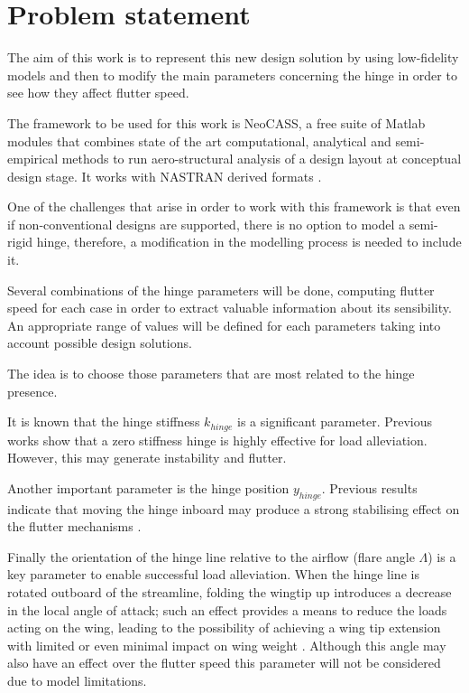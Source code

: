 \documentclass[conference]{IEEEtran}
\begin{document}
\section{Problem statement}
\label{sec:problem-statement}

The aim of this work is to represent this new design solution by using low-fidelity models and then to modify the main parameters concerning the hinge in order to see how they affect flutter speed.

The framework to be used for this work is NeoCASS, a free suite of Matlab modules that combines state of the art computational, analytical and semi-empirical methods to run aero-structural analysis of a design layout at conceptual design stage. It works with NASTRAN derived formats \cite{cavagna2011neocass}.

One of the challenges that arise in order to work with this framework is that even if non-conventional designs are supported, there is no option to model a semi-rigid hinge, therefore, a modification in the modelling process is needed to include it.

Several combinations of the hinge parameters will be done, computing flutter speed for each case in order to extract valuable information about its sensibility. An appropriate range of values will be defined for each parameters taking into account possible design solutions.

The idea is to choose those parameters that are most related to the hinge presence.

It is known that the hinge stiffness $k_{hinge}$ is a significant parameter. Previous works \cite{Wilson2014,Castrichini2016}show that a zero stiffness hinge is highly effective for load alleviation. However, this may generate instability and flutter.

Another important parameter is the hinge position $y_{hinge}$. Previous results indicate that moving the hinge inboard may produce a strong stabilising effect on the flutter mechanisms \cite{Wilson2014}.

Finally the orientation of the hinge line relative to the airflow (flare angle $\Lambda$) is a key parameter to enable successful load alleviation. When the hinge line is rotated outboard of the streamline, folding the wingtip up introduces a decrease in the local angle of attack; such an effect provides a means to reduce the loads acting on the wing, leading to the possibility of achieving a wing tip extension with limited or even minimal impact on wing weight \cite{Castrichini2020,Wilson2014}. Although this angle may also have an effect over the flutter speed this parameter will not be considered due to model limitations.
\end{document}
